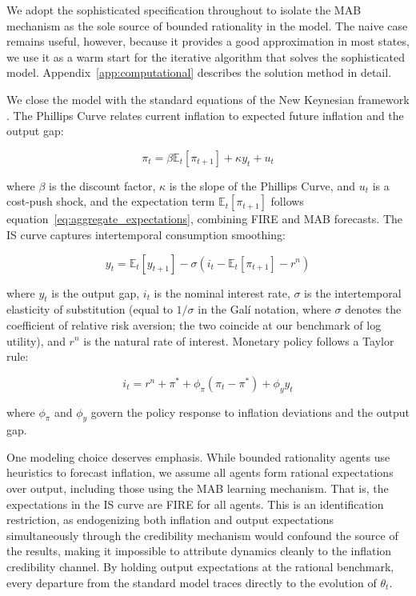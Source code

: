 \documentclass[10pt]{article}
\begin{document}
We adopt the sophisticated specification throughout to isolate the MAB mechanism as the sole source of bounded rationality in the model. The naive case remains useful, however, because it provides a good approximation in most states, we use it as a warm start for the iterative algorithm that solves the sophisticated model. Appendix~\ref{app:computational} describes the solution method in detail.

We close the model with the standard equations of the New Keynesian framework \citep{gali2015monetary}. The Phillips Curve relates current inflation to expected future inflation and the output gap:

\begin{equation}
\pi_t = \beta \mathbb{E}_t[\pi_{t+1}] + \kappa y_t + u_t
\end{equation}

where $\beta$ is the discount factor, $\kappa$ is the slope of the Phillips Curve, and $u_t$ is a cost-push shock, and the expectation term $\mathbb{E}_t[\pi_{t+1}]$ follows equation~\eqref{eq:aggregate_expectations}, combining FIRE and MAB forecasts. The IS curve captures intertemporal consumption smoothing:

\begin{equation}
y_t = \mathbb{E}_t[y_{t+1}] - \sigma(i_t - \mathbb{E}_t[\pi_{t+1}] - r^n)
\end{equation}

where $y_t$ is the output gap, $i_t$ is the nominal interest rate, $\sigma$ is the intertemporal elasticity of substitution (equal to $1/\sigma$ in the Gal\'i notation, where $\sigma$ denotes the coefficient of relative risk aversion; the two coincide at our benchmark of log utility), and $r^n$ is the natural rate of interest. Monetary policy follows a Taylor rule:

\begin{equation}
i_t = r^n + \pi^* + \phi_\pi(\pi_t - \pi^*) + \phi_y y_t
\end{equation}

where $\phi_\pi$ and $\phi_y$ govern the policy response to inflation deviations and the output gap.

One modeling choice deserves emphasis. While bounded rationality agents use heuristics to forecast inflation, we assume all agents form rational expectations over output, including those using the MAB learning mechanism. That is, the expectations in the IS curve are FIRE for all agents. This is an identification restriction, as endogenizing both inflation and output expectations simultaneously through the credibility mechanism would confound the source of the results, making it impossible to attribute dynamics cleanly to the inflation credibility channel. By holding output expectations at the rational benchmark, every departure from the standard model traces directly to the evolution of $\theta_t$.
\end{document}
